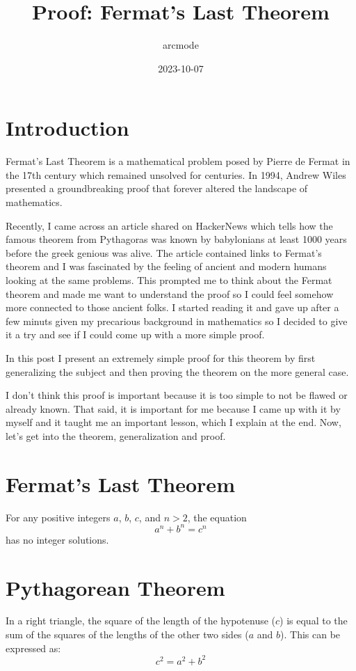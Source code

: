 \documentclass{article}
\begin{document}
\title{Proof: Fermat's Last Theorem}
\author{arcmode}
\date{2023-10-07}

\maketitle

\section{Introduction}
Fermat's Last Theorem is a mathematical problem posed by Pierre de Fermat in the 17th century which remained unsolved for centuries. In 1994, Andrew Wiles presented a groundbreaking proof that forever altered the landscape of mathematics.

Recently, I came across an article shared on HackerNews which tells how the famous theorem from Pythagoras was known by babylonians at least 1000 years before the greek genious was alive. The article contained links to Fermat's theorem and I was fascinated by the feeling of ancient and modern humans looking at the same problems. This prompted me to think about the Fermat theorem and made me want to understand the proof so I could feel somehow more connected to those ancient folks. I started reading it and gave up after a few minuts given my precarious background in mathematics so I decided to give it a try and see if I could come up with a more simple proof.

In this post I present an extremely simple proof for this theorem by first generalizing the subject and then proving the theorem on the more general case.

I don't think this proof is important because it is too simple to not be flawed or already known. That said, it is important for me because I came up with it by myself and it taught me an important lesson, which I explain at the end. Now, let's get into the theorem, generalization and proof.

\section{Fermat's Last Theorem}
For any positive integers $a$, $b$, $c$, and $n > 2$, the equation
\begin{equation}
a^n + b^n = c^n
\end{equation}
has no integer solutions.

\section{Pythagorean Theorem}
In a right triangle, the square of the length of the hypotenuse (\(c\)) is equal to the sum of the squares of the lengths of the other two sides (\(a\) and \(b\)). This can be expressed as:
\begin{equation}
c^2 = a^2 + b^2
\end{equation}
\end{document}
